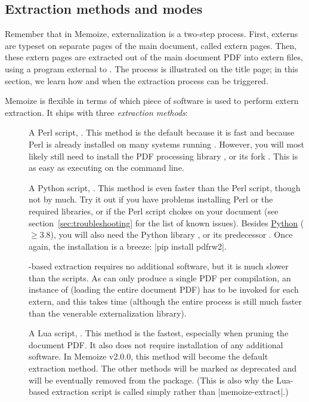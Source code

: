 \documentclass[a4paper,11pt]{article}
\begin{document}
\subsection{Extraction methods and modes}
\label{sec:extraction}

Remember that in Memoize, externalization is a two-step process.  First,
externs are typeset on separate pages of the main document, called extern
pages.  Then, these extern pages are extracted out of the main document PDF
into extern files, using a program external to .  The process is
illustrated on the title page; in this section, we learn how and when the
extraction process can be triggered.

Memoize is flexible in terms of which piece of software is used to perform
extern extraction.  It ships with three \emph{extraction methods}:

\begin{description}
\item[] A Perl script, .
  This method is the default because it is fast and because Perl is already
  installed on many systems running .  However, you will most
  likely still need to install the PDF processing library
  , or its fork
  .  This is as
  easy as executing  on the command line.
\item[] A Python script, .
  This method is even faster than the Perl script, though not by much.  Try it
  out if you have problems installing Perl or the required libraries, or if the
  Perl script chokes on your document (see section~\ref{sec:troubleshooting}
  for the list of known issues).  Besides \href{https://www.python.org}{Python}
  ($\geq 3.8$), you will also need the Python library
  , or its predecessor
  .  Once again, the
  installation is a breeze: |pip install pdfrw2|.
\item[] -based extraction requires no
  additional software, but it is much slower than the scripts.  As 
  can only produce a single PDF per compilation, an instance of 
  (loading the entire document PDF) has to be invoked for each extern, and this
  takes time (although the entire process is still much faster than the
  venerable \TikZ externalization library).
\item[] A Lua script, .
  This method is the fastest, especially when pruning the document PDF.  It
  also does not require installation of any additional software.  In Memoize
  v2.0.0, this method will become the default extraction method.  The other
  methods will be marked as deprecated and will be eventually removed from the
  package. (This is also why the Lua-based extraction script is called simply
   rather than |memoize-extract|.)
\end{description}
\end{document}
